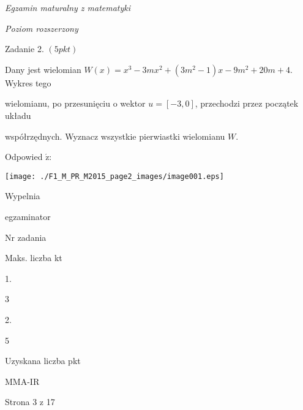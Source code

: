 \documentclass[a4paper,12pt]{article}
\begin{document}
{\it Egzamin maturalny z matematyki}

{\it Poziom rozszerzony}

Zadanie 2. $(5pkt)$

Dany jest wielomian $W(x)=x^{3}-3mx^{2}+(3m^{2}-1)x-9m^{2}+20m+4$. Wykres tego

wielomianu, po przesunięciu o wektor $u=[-3,0]$, przechodzi przez początek układu

współrzędnych. Wyznacz wszystkie pierwiastki wielomianu $W.$

Odpowied $\acute{\mathrm{z}}$:
\begin{center}
\texttt{[image: ./F1\_M\_PR\_M2015\_page2\_images/image001.eps]}
\end{center}
Wypelnia

egzaminator

Nr zadania

Maks. liczba kt

1.

3

2.

5

Uzyskana liczba pkt

MMA-IR

Strona 3 z 17
\end{document}

